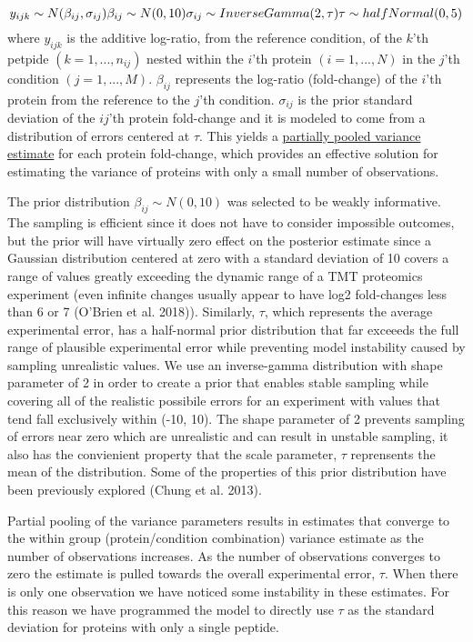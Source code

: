 \documentclass[]{article}
\begin{document}
\[
y_{ijk} \sim N(\beta_{ij}, \sigma_{ij})\\
\beta_{ij} \sim N(0, 10) \\
\sigma_{ij} \sim InverseGamma(2, \tau)\\
\tau \sim halfNormal(0,5)\\
\] where \(y_{ijk}\) is the additive log-ratio, from the reference
condition, of the \(k\)'th petpide \((k = 1,..., n_{ij})\) nested within
the \(i\)'th protein \((i = 1,..., N)\) in the \(j\)'th condition
\((j = 1,...,M)\). \(\beta_{ij}\) represents the log-ratio (fold-change)
of the \(i\)'th protein from the reference to the \(j\)'th condition.
\(\sigma_{ij}\) is the prior standard deviation of the \(ij\)'th protein
fold-change and it is modeled to come from a distribution of errors
centered at \(\tau\). This yields a
\href{http://mc-stan.org/users/documentation/case-studies/pool-binary-trials.html}{partially
pooled variance estimate} for each protein fold-change, which provides
an effective solution for estimating the variance of proteins with only
a small number of observations.

The prior distribution \(\beta_{ij} \sim N(0, 10)\) was selected to be
weakly informative. The sampling is efficient since it does not have to
consider impossible outcomes, but the prior will have virtually zero
effect on the posterior estimate since a Gaussian distribution centered
at zero with a standard deviation of 10 covers a range of values greatly
exceeding the dynamic range of a TMT proteomics experiment (even
infinite changes usually appear to have log2 fold-changes less than 6 or
7 (O'Brien et al. 2018)). Similarly, \(\tau\), which represents the
average experimental error, has a half-normal prior distribution that
far exceeeds the full range of plausible experimental error while
preventing model instability caused by sampling unrealistic values. We
use an inverse-gamma distribution with shape parameter of 2 in order to
create a prior that enables stable sampling while covering all of the
realistic possibile errors for an experiment with values that tend fall
exclusively within (-10, 10). The shape parameter of 2 prevents sampling
of errors near zero which are unrealistic and can result in unstable
sampling, it also has the convienient property that the scale parameter,
\(\tau\) reprensents the mean of the distribution. Some of the
properties of this prior distribution have been previously explored
(Chung et al. 2013).

Partial pooling of the variance parameters results in estimates that
converge to the within group (protein/condition combination) variance
estimate as the number of observations increases. As the number of
observations converges to zero the estimate is pulled towards the
overall experimental error, \(\tau\). When there is only one observation
we have noticed some instability in these estimates. For this reason we
have programmed the model to directly use \(\tau\) as the standard
deviation for proteins with only a single peptide.
\end{document}
